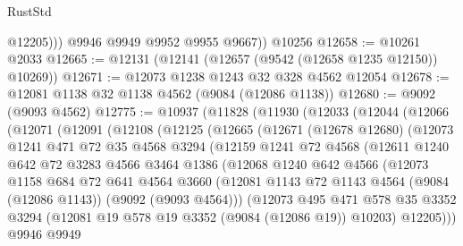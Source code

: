 \begin{lexlean}{RustStd}
\begin{coremodule}
              @12205)))
        @9946
        @9949
        @9952
        @9955
        @9667))
    @10256
@12658 := @10261 @2033
@12665 := @12131 (@12141 (@12657 (@9542 (@12658 @1235 @12150)) @10269))
@12671 := @12073 @1238 @1243 @32 @328 @4562 @12054
@12678 := @12081 @1138 @32 @1138 @4562 (@9084 (@12086 @1138))
@12680 := @9092 (@9093 @4562)
@12775 := @10937
    (@11828
      (@11930
        (@12033
          (@12044
            (@12066
              (@12071
                (@12091
                  (@12108
                    (@12125
                      (@12665
                        (@12671
                          (@12678 @12680)
                          (@12073
                            @1241
                            @471
                            @72
                            @35
                            @4568
                            @3294
                            (@12159
                              @1241
                              @72
                              @4568
                              (@12611
                                @1240
                                @642
                                @72
                                @3283
                                @4566
                                @3464
                                @1386
                                (@12068
                                  @1240
                                  @642
                                  @4566
                                  (@12073
                                    @1158
                                    @684
                                    @72
                                    @641
                                    @4564
                                    @3660
                                    (@12081
                                      @1143
                                      @72
                                      @1143
                                      @4564
                                      (@9084 (@12086 @1143))
                                      (@9092 (@9093 @4564)))
                                    (@12073
                                      @495
                                      @471
                                      @578
                                      @35
                                      @3352
                                      @3294
                                      (@12081 @19 @578 @19 @3352 (@9084 (@12086 @19)) @10203)
                                      @12205)))
                                @9946
                                @9949

\end{coremodule}
\end{lexlean}
